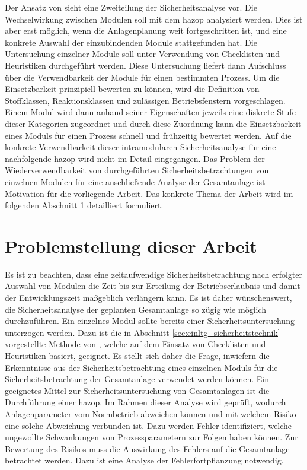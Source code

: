 Der Ansatz von \citeauthor{Fleischer_2015} sieht eine Zweiteilung der Sicherheitsanalyse vor. Die Wechselwirkung zwischen Modulen soll mit dem \acf{hazop} analysiert werden. Dies ist aber erst m\"oglich, wenn die Anlagenplanung weit fortgeschritten ist, und eine konkrete Auswahl der einzubindenden Module stattgefunden hat. Die Untersuchung einzelner Module soll unter Verwendung von Checklisten und Heuristiken durchgef\"uhrt werden. Diese Untersuchung  liefert dann Aufschluss \"uber die Verwendbarkeit der Module f\"ur einen bestimmten Prozess. Um die Einsetzbarkeit prinzipiell bewerten zu k\"onnen, wird die Definition von Stoffklassen, Reaktionsklassen und zul\"assigen Betriebsfenstern vorgeschlagen. Einem Modul wird dann anhand seiner Eigenschaften jeweils eine diskrete Stufe dieser Kategorien zugeordnet und durch diese Zuordnung kann die Einsetzbarkeit eines Moduls f\"ur einen Prozess schnell und fr\"uhzeitig bewertet werden. Auf die konkrete Verwendbarkeit dieser intramodularen Sicherheitsanalyse f\"ur eine nachfolgende \ac{hazop} wird nicht im Detail eingegangen. Das Problem der Wiederverwendbarkeit von durchgef\"uhrten Sicherheitsbetrachtungen von einzelnen Modulen f\"ur eine anschlie\ss{}ende Analyse der Gesamtanlage ist Motivation f\"ur die vorliegende Arbeit. Das konkrete Thema der Arbeit wird im folgenden Abschnitt \ref{sec:einltg_aufgabe} detailliert formuliert.

\section{Problemstellung dieser Arbeit}\label{sec:einltg_aufgabe}

Es ist zu beachten, dass eine zeitaufwendige Sicherheitsbetrachtung nach erfolgter Auswahl von Modulen die Zeit bis zur Erteilung der Betriebserlaubnis und damit der Entwicklungszeit ma\ss{}geblich verl\"angern kann. Es ist daher w\"unschenswert, die Sicherheitsanalyse der geplanten Gesamtanlage so z\"ugig wie m\"oglich durchzuf\"uhren. \newline
Ein einzelnes Modul sollte bereits einer Sicherheitsuntersuchung unterzogen werden. Dazu ist die in Abschnitt \ref{sec:einltg_sicherheitstechnik} vorgestellte Methode von \citeauthor{Fleischer_2015}, welche auf dem Einsatz von Checklisten und Heuristiken basiert, geeignet.  Es stellt sich daher die Frage, inwiefern die Erkenntnisse aus der Sicherheitsbetrachtung eines einzelnen Moduls f\"ur die Sicherheitsbetrachtung der Gesamtanlage verwendet werden k\"onnen. \newline
Ein geeignetes Mittel zur Sicherheitsuntersuchung von Gesamtanlagen ist die Durchf\"uhrung einer \ac{hazop}. Im Rahmen dieser Analyse wird gepr\"uft, wodurch Anlagenparameter vom Normbetrieb abweichen k\"onnen und mit welchem Risiko eine solche Abweichung verbunden ist. Dazu werden Fehler identifiziert, welche ungewollte Schwankungen von Prozessparametern zur Folgen haben k\"onnen. Zur Bewertung des Risikos muss die Auswirkung des Fehlers auf die Gesamtanlage betrachtet werden. Dazu ist eine Analyse der Fehlerfortpflanzung notwendig. 

